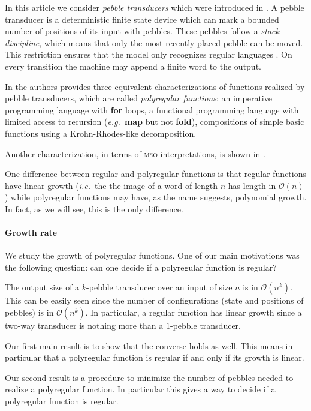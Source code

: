 \documentclass[sigplan,review,anonymous]{acmart}\settopmatter{printfolios=true,printccs=false,printacmref=false}
\newcommand{\Oo}{\mathcal O}
\newcommand{\mso}{\textsc{mso}\xspace}
\theoremstyle{definition}
\theoremstyle{remark}
\begin{document}
In this article we consider \emph{pebble transducers} which were introduced in \cite{MiloSV03}. A pebble transducer is a deterministic finite state device which can mark a bounded number of positions of its input with pebbles. These pebbles follow a \emph{stack discipline}, which means that only the most recently placed pebble can be moved. This restriction ensures that the model only recognizes regular languages \cite{GlobermanH96}. On every transition the machine may append a finite word to the output.

In \cite{Bojanczyk18} the authors provides three equivalent characterizations of functions realized by pebble transducers, which are called \emph{polyregular functions}:
an imperative programming language with \textbf{for} loops, a functional programming language with limited access to recursion (\textit{e.g.}~\textbf{map} but not \textbf{fold}), compositions of simple basic functions using a Krohn-Rhodes-like decomposition.

Another characterization, in terms of \mso interpretations, is shown in \cite{BojanczykKL19}.

One difference between regular and polyregular functions is that regular functions have linear growth (\textit{i.e.}~the  the image of a word of length $n$ has length in $\Oo(n)$) while polyregular functions may have, as the name suggests, polynomial growth. In fact, as we will see, this is the only difference.

\paragraph*{Growth rate}
We study the growth of polyregular functions. One of our main motivations was the following question: can one decide if a polyregular function is regular?

The output size of a $k$-pebble transducer over an input of size $n$ is in $\Oo(n^k)$. This can be easily seen since the number of configurations (state and positions of pebbles) is in $\Oo(n^k)$. In particular, a regular function has linear growth since a two-way transducer is nothing more than a $1$-pebble transducer.

Our first main result is to show that the converse holds as well. This means in particular that a polyregular function is regular if and only if its growth is linear.

Our second result is a procedure to minimize the number of pebbles needed to realize a polyregular function.
In particular this gives a way to decide if a polyregular function is regular.
\end{document}
